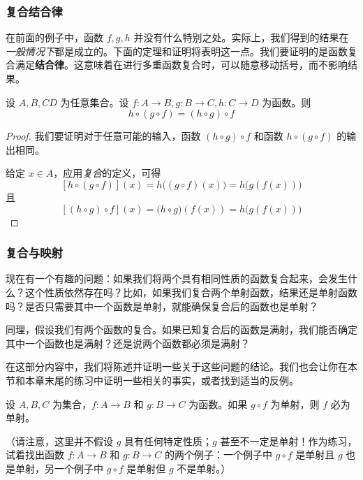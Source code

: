 \subsubsection*{复合结合律}

在前面的例子中，函数 $f, g, h$ 并没有什么特别之处。实际上，我们得到的结果在\emph{一般情况下}都是成立的。下面的定理和证明将表明这一点。我们要证明的是函数复合满足\textbf{结合律}。这意味着在进行多重函数复合时，可以随意移动括号，而不影响结果。

\begin{theorem}
    设 $A,B,C D$ 为任意集合。设 $f : A \to B, g : B \to C, h : C \to D$ 为函数。则
    \[h \circ (g \circ f) = (h \circ g) \circ f\]
\end{theorem}

\begin{proof}
    我们要证明对于任意可能的输入，函数 $(h \circ g) \circ f$ 和函数 $h \circ (g \circ f)$ 的输出相同。

    给定 $x \in A$，应用\emph{复合}的定义，可得
    \[[h \circ (g \circ f)](x) = h\big((g \circ f)(x)\big) = h\big(g(f(x))\big)\]
    且
    \[[(h \circ g) \circ f](x) = \big(h \circ g\big)(f(x)) = h\big(g(f(x))\big)\]
\end{proof}

\subsubsection*{复合与映射}

现在有一个有趣的问题：如果我们将两个具有相同性质的函数复合起来，会发生什么？这个性质依然存在吗？比如，如果我们复合两个单射函数，结果还是单射函数吗？是否只需要其中一个函数是单射，就能确保复合后的函数也是单射？

同理，假设我们有两个函数的复合。如果已知复合后的函数是满射，我们能否确定其中一个函数也是满射？还是说两个函数都必须是满射？

在这部分内容中，我们将陈述并证明一些关于这些问题的结论。我们也会让你在本节和本章末尾的练习中证明一些相关的事实，或者找到适当的反例。

\begin{proposition}
    设 $A, B, C$ 为集合，$f : A \to B$ 和 $g : B \to C$ 为函数。如果 $g \circ f$ 为单射，则 $f$ 必为单射。
\end{proposition}

（请注意，这里并不假设 $g$ 具有任何特定性质；$g$ 甚至不一定是单射！作为练习，试着找出函数 $f: A \to B$ 和 $g: B \to C$ 的两个例子：一个例子中 $g \circ f$ 是单射且 $g$ 也是单射，另一个例子中 $g \circ f$ 是单射但 $g$ 不是单射。）

